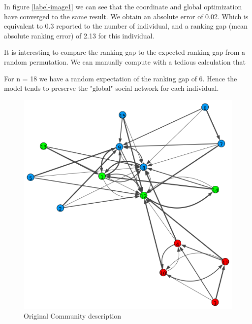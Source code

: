 \documentclass[12pt]{ociamthesis}  %
\begin{document}
	In figure \ref{label-image1} we can see that the coordinate and global optimization have converged to the same result. We obtain an absolute error of 0.02. Which is equivalent to 0.3 reported to the number of individual, and a ranking gap (mean absolute ranking error) of 2.13 for this individual.
	
	It is interesting to compare the ranking gap to the expected ranking gap from a random permutation. We can manually compute with a tedious calculation that
	\begin{center}
	\end{center}
	
	For n = 18 we have a random expectation of the ranking gap of 6. Hence the model tends to preserve the "global" social network for each individual.
	
	\begin{figure}
		\centering
		\includegraphics[width=\textwidth,height=\textheight,keepaspectratio]{OriginalPlot}
		\caption{Original Community description}
		\label{label-image2}
	\end{figure}
\end{document}
